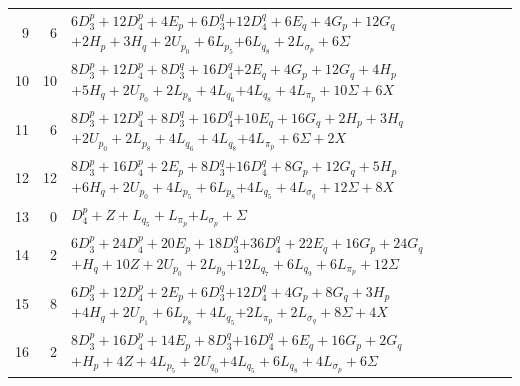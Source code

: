 \documentclass[11pt,a4paper]{article}
\theoremstyle{remark}
\begin{document}
\begin{longtable}{rrp{12.7cm}}
9&6&\( 6D_3^p + 12D_4^p + 4E_p + 6D_3^q \)\newline\( + 12D_4^q + 6E_q + 4G_p + 12G_q \)\newline\( + 2H_p + 3H_q + 2U_{p_{0}} + 6L_{p_{5}} \)\newline\( + 6L_{q_{8}} + 2L_{\sigma_p} + 6\Sigma \)\\[3pt]
10&10&\( 8D_3^p + 12D_4^p + 8D_3^q + 16D_4^q \)\newline\( + 2E_q + 4G_p + 12G_q + 4H_p \)\newline\( + 5H_q + 2U_{p_{0}} + 2L_{p_{8}} + 4L_{q_{6}} \)\newline\( + 4L_{q_{8}} + 4L_{\pi_p} + 10\Sigma + 6X \)\\[3pt]
11&6&\( 8D_3^p + 12D_4^p + 8D_3^q + 16D_4^q \)\newline\( + 10E_q + 16G_q + 2H_p + 3H_q \)\newline\( + 2U_{p_{0}} + 2L_{p_{8}} + 4L_{q_{6}} + 4L_{q_{8}} \)\newline\( + 4L_{\pi_p} + 6\Sigma + 2X \)\\[3pt]
12&12&\( 8D_3^p + 16D_4^p + 2E_p + 8D_3^q \)\newline\( + 16D_4^q + 8G_p + 12G_q + 5H_p \)\newline\( + 6H_q + 2U_{p_{0}} + 4L_{p_{5}} + 6L_{p_{8}} \)\newline\( + 4L_{q_{5}} + 4L_{\sigma_q} + 12\Sigma + 8X \)\\[3pt]
13&0&\( D_4^p + Z + L_{q_{5}} + L_{\pi_p} \)\newline\( + L_{\sigma_p} + \Sigma \)\\[3pt]
14&2&\( 6D_3^p + 24D_4^p + 20E_p + 18D_3^q \)\newline\( + 36D_4^q + 22E_q + 16G_p + 24G_q \)\newline\( + H_q + 10Z + 2U_{p_{0}} + 2L_{p_{9}} \)\newline\( + 12L_{q_{7}} + 6L_{q_{9}} + 6L_{\pi_p} + 12\Sigma \)\\[3pt]
15&8&\( 6D_3^p + 12D_4^p + 2E_p + 6D_3^q \)\newline\( + 12D_4^q + 4G_p + 8G_q + 3H_p \)\newline\( + 4H_q + 2U_{p_{1}} + 6L_{p_{8}} + 4L_{q_{5}} \)\newline\( + 2L_{\pi_p} + 2L_{\sigma_q} + 8\Sigma + 4X \)\\[3pt]
16&2&\( 8D_3^p + 16D_4^p + 14E_p + 8D_3^q \)\newline\( + 16D_4^q + 6E_q + 16G_p + 2G_q \)\newline\( + H_p + 4Z + 4L_{p_{5}} + 2U_{q_{0}} \)\newline\( + 4L_{q_{5}} + 6L_{q_{8}} + 4L_{\sigma_p} + 6\Sigma \)\\[3pt]

\end{longtable}
\end{document}
